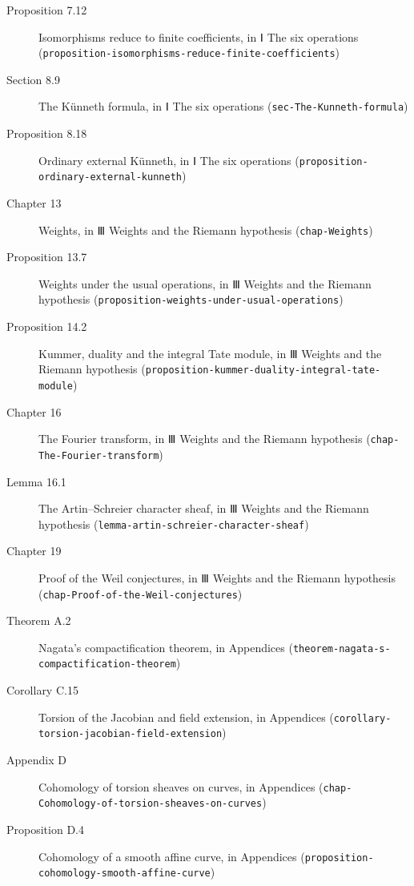\documentclass[11pt]{article}
\newcommand{\bpslug}[1]{\texttt{#1}}
\begin{document}
\begin{description}
\item[Proposition 7.12] Isomorphisms reduce to finite coefficients, in Ⅰ The six operations (\bpslug{proposition-{}\allowbreak{}isomorphisms-{}\allowbreak{}reduce-{}\allowbreak{}finite-{}\allowbreak{}coefficients})
\item[Section 8.9] The Künneth formula, in Ⅰ The six operations (\bpslug{sec-{}\allowbreak{}The-{}\allowbreak{}Kunneth-{}\allowbreak{}formula})
\item[Proposition 8.18] Ordinary external Künneth, in Ⅰ The six operations (\bpslug{proposition-{}\allowbreak{}ordinary-{}\allowbreak{}external-{}\allowbreak{}kunneth})
\item[Chapter 13] Weights, in Ⅲ Weights and the Riemann hypothesis (\bpslug{chap-{}\allowbreak{}Weights})
\item[Proposition 13.7] Weights under the usual operations, in Ⅲ Weights and the Riemann hypothesis (\bpslug{proposition-{}\allowbreak{}weights-{}\allowbreak{}under-{}\allowbreak{}usual-{}\allowbreak{}operations})
\item[Proposition 14.2] Kummer, duality and the integral Tate module, in Ⅲ Weights and the Riemann hypothesis (\bpslug{proposition-{}\allowbreak{}kummer-{}\allowbreak{}duality-{}\allowbreak{}integral-{}\allowbreak{}tate-{}\allowbreak{}module})
\item[Chapter 16] The Fourier transform, in Ⅲ Weights and the Riemann hypothesis (\bpslug{chap-{}\allowbreak{}The-{}\allowbreak{}Fourier-{}\allowbreak{}transform})
\item[Lemma 16.1] The Artin–Schreier character sheaf, in Ⅲ Weights and the Riemann hypothesis (\bpslug{lemma-{}\allowbreak{}artin-{}\allowbreak{}schreier-{}\allowbreak{}character-{}\allowbreak{}sheaf})
\item[Chapter 19] Proof of the Weil conjectures, in Ⅲ Weights and the Riemann hypothesis (\bpslug{chap-{}\allowbreak{}Proof-{}\allowbreak{}of-{}\allowbreak{}the-{}\allowbreak{}Weil-{}\allowbreak{}conjectures})
\item[Theorem A.2] Nagata's compactification theorem, in Appendices (\bpslug{theorem-{}\allowbreak{}nagata-{}\allowbreak{}s-{}\allowbreak{}compactification-{}\allowbreak{}theorem})
\item[Corollary C.15] Torsion of the Jacobian and field extension, in Appendices (\bpslug{corollary-{}\allowbreak{}torsion-{}\allowbreak{}jacobian-{}\allowbreak{}field-{}\allowbreak{}extension})
\item[Appendix D] Cohomology of torsion sheaves on curves, in Appendices (\bpslug{chap-{}\allowbreak{}Cohomology-{}\allowbreak{}of-{}\allowbreak{}torsion-{}\allowbreak{}sheaves-{}\allowbreak{}on-{}\allowbreak{}curves})
\item[Proposition D.4] Cohomology of a smooth affine curve, in Appendices (\bpslug{proposition-{}\allowbreak{}cohomology-{}\allowbreak{}smooth-{}\allowbreak{}affine-{}\allowbreak{}curve})
\end{description}
\clearpage{}%
\end{document}
